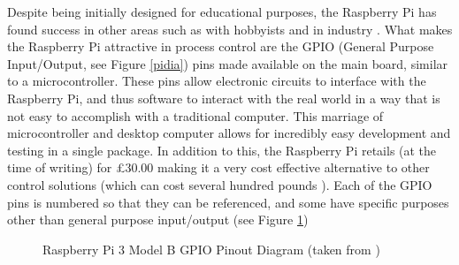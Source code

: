 \documentclass[a4]{report}
\begin{document}
	Despite being initially designed for educational purposes, the Raspberry Pi has found success in other areas such as with hobbyists \cite{pihobbynotedu} and in industry \cite{pimorethanedu}.\newline \newline  \noindent
	What makes the Raspberry Pi attractive in process control are the GPIO (General Purpose Input/Output, see Figure \ref{pidia}) pins made available on the main board, similar to a microcontroller. These pins allow electronic circuits to interface with the Raspberry Pi, and thus software to interact with the real world in a way that is not easy to accomplish with a traditional computer. This marriage of microcontroller and desktop computer allows for incredibly easy development and testing in a single package. In addition to this, the Raspberry Pi retails (at the time of writing) for £30.00 \cite{picost} making it a very cost effective alternative to other control solutions (which can cost several hundred pounds \cite{otherpcucost}). Each of the GPIO pins is numbered so that they can be referenced, and some have specific purposes other than general purpose input/output (see Figure \ref{gpiopinout})\newline
	\begin{figure}[!h]
	\centering
	\caption{Raspberry Pi 3 Model B GPIO Pinout Diagram (taken from  \cite{pigpiopinout})}
	\label{gpiopinout}
	\end{figure} \newline  \noindent
\end{document}
